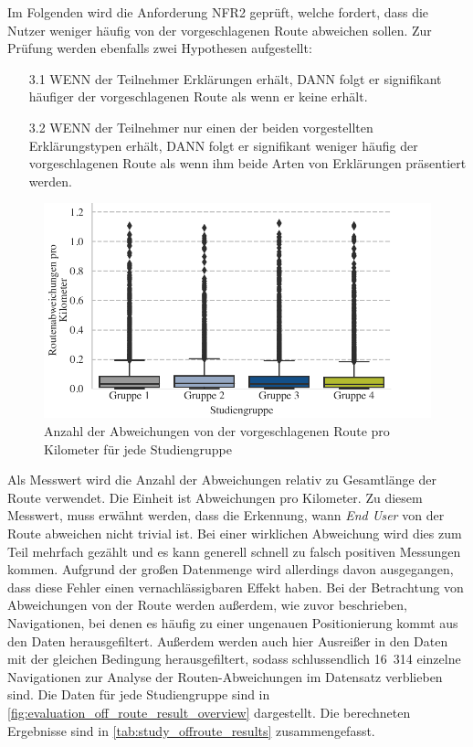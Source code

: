 Im Folgenden wird die Anforderung NFR2 geprüft, welche fordert, dass die Nutzer weniger häufig von der vorgeschlagenen Route abweichen sollen. Zur Prüfung werden ebenfalls zwei Hypothesen aufgestellt:

\begin{enumerate}
    \item[3.1] WENN der Teilnehmer Erklärungen erhält, DANN folgt er signifikant häufiger der vorgeschlagenen Route als wenn er keine erhält.
    \item[3.2] WENN der Teilnehmer nur einen der beiden vorgestellten Erklärungstypen erhält, DANN folgt er signifikant weniger häufig der vorgeschlagenen Route als wenn ihm beide Arten von Erklärungen präsentiert werden.
\end{enumerate}

\begin{figure}[htb!]
    \centering
    \includegraphics[width=\textwidth]{contents/06_model_evaluation/02_evaluation/res/off_route_result_overview.pdf}
    \caption{Anzahl der Abweichungen von der vorgeschlagenen Route pro Kilometer für jede Studiengruppe}
    \label{fig:evaluation_off_route_result_overview}
\end{figure}

Als Messwert wird die Anzahl der Abweichungen relativ zu Gesamtlänge der Route verwendet. Die Einheit ist Abweichungen pro Kilometer. Zu diesem Messwert, muss erwähnt werden, dass die Erkennung, wann \textit{End User} von der Route abweichen nicht trivial ist. Bei einer wirklichen Abweichung wird dies zum Teil mehrfach gezählt und es kann generell schnell zu falsch positiven Messungen kommen. Aufgrund der großen Datenmenge wird allerdings davon ausgegangen, dass diese Fehler einen vernachlässigbaren Effekt haben. Bei der Betrachtung von Abweichungen von der Route werden außerdem, wie zuvor beschrieben, Navigationen, bei denen es häufig zu einer ungenauen Positionierung kommt aus den Daten herausgefiltert. Außerdem werden auch hier Ausreißer in den Daten mit der gleichen Bedingung herausgefiltert, sodass schlussendlich 16~314 einzelne Navigationen zur Analyse der Routen-Abweichungen im Datensatz verblieben sind. Die Daten für jede Studiengruppe sind in \autoref{fig:evaluation_off_route_result_overview} dargestellt. Die berechneten Ergebnisse sind in \autoref{tab:study_offroute_results} zusammengefasst.


